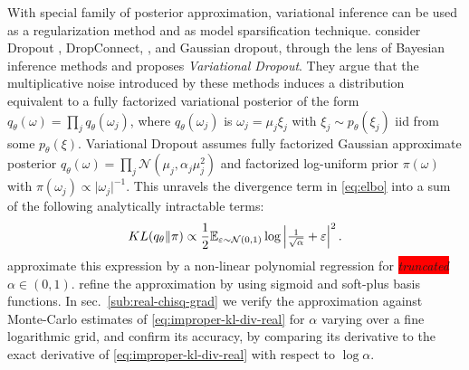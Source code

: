 \documentclass[a4paper,10pt]{article}
\newcommand{\verify}[1]{\textit{\!\colorbox{red}{#1}\!}}
\begin{document}
With special family of posterior approximation, variational inference can be used as
a regularization method and as model sparsification technique. \citet{kingma_variational_2015}
consider Dropout \citep{hinton_improving_2012}, DropConnect, \citep{wan_regularization_2013},
and Gaussian dropout, \citep{srivastava_dropout_2014,wang_fast_2013} through the lens
of Bayesian inference methods and proposes \textit{Variational Dropout}. They argue that
the multiplicative noise introduced by these methods induces a distribution equivalent to
a fully factorized variational posterior of the form $
  q_\theta(\omega) = \prod_j q_{\theta}(\omega_j)
$, where $q_{\theta}(\omega_j)$ is $\omega_j = \mu_j \xi_j$ with $
  \xi_j \sim p_\theta(\xi_j)
$ iid from some $p_\theta(\xi)$.
%
%
Variational Dropout assumes fully factorized Gaussian approximate posterior $
  q_\theta(\omega)
    = \prod_j \mathcal{N}(\mu_j, \alpha_j \mu_j^2)
$ and factorized log-uniform prior $\pi(\omega)$ with $
  \pi(\omega_j) \propto \lvert \omega_j \rvert^{-1}
$. This unravels the divergence term in \eqref{eq:elbo} into a sum of the following
analytically intractable terms:
\begin{equation}  \label{eq:improper-kl-div-real}
  KL(q_\theta \| \pi)
    \propto
      \frac12 \mathbb{E}_{\varepsilon \sim \mathcal{N}(0, 1)}
        \log{\Bigl\lvert \tfrac1{\sqrt{\alpha}} + \varepsilon \Bigr\rvert^2}
  \,.
\end{equation}
\citet{kingma_variational_2015} approximate this expression by a non-linear polynomial
regression for \verify{truncated} $\alpha \in (0, 1)$. \citet{molchanov_variational_2017}
refine the approximation by using sigmoid and soft-plus basis functions.
%
In sec.~\ref{sub:real-chisq-grad} we verify the approximation against Monte-Carlo
estimates of \eqref{eq:improper-kl-div-real} for $\alpha$ varying over a fine logarithmic
grid, and confirm its accuracy, by comparing its derivative to the exact derivative of
\eqref{eq:improper-kl-div-real} with respect to $\log \alpha$.
\end{document}
